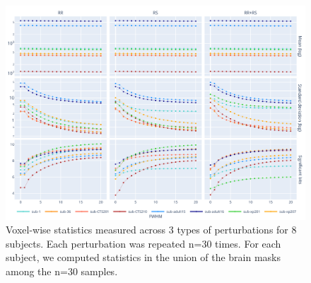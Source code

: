 \documentclass{article}
\begin{document}
\begin{figure}
    \centering
    \includegraphics[width=\linewidth]{figures/stats.pdf}
    \caption{Voxel-wise statistics measured across 3 types of perturbations for 8 subjects. Each perturbation was repeated n=30 times. For each subject, we computed statistics in the union of the brain masks among the n=30 samples.}
    \label{fig:numerical-uncertainty}
\end{figure}
\end{document}
